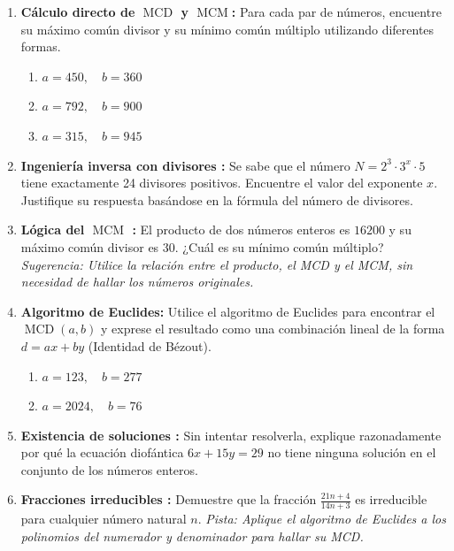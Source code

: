 \begin{enumerate}
    
    \item \textbf{Cálculo directo de $\operatorname{MCD}$ y $\operatorname{MCM}$:} 
    Para cada par de números, encuentre su máximo común divisor y su mínimo común múltiplo utilizando diferentes formas.
    \begin{enumerate}
        \item $a = 450, \quad b = 360$
        \item $a = 792, \quad b = 900$
        \item $a = 315, \quad b = 945$
    \end{enumerate}

    \item \textbf{Ingeniería inversa con divisores :}
    Se sabe que el número $N = 2^3 \cdot 3^x \cdot 5$ tiene exactamente 24 divisores positivos. Encuentre el valor del exponente $x$. Justifique su respuesta basándose en la fórmula del número de divisores.

    \item \textbf{Lógica del $\operatorname{MCM}$ :}
    El producto de dos números enteros es $16200$ y su máximo común divisor es $30$. ¿Cuál es su mínimo común múltiplo? 
    \textit{Sugerencia: Utilice la relación entre el producto, el MCD y el MCM, sin necesidad de hallar los números originales.}


    \item \textbf{Algoritmo de Euclides:}
    Utilice el algoritmo de Euclides para encontrar el $\operatorname{MCD}(a,b)$ y exprese el resultado como una combinación lineal de la forma $d = ax + by$ (Identidad de Bézout).
    \begin{enumerate}
        \item $a = 123, \quad b = 277$
        \item $a = 2024, \quad b = 76$
    \end{enumerate}

    \item \textbf{Existencia de soluciones :}
    Sin intentar resolverla, explique razonadamente por qué la ecuación diofántica $6x + 15y = 29$ no tiene ninguna solución en el conjunto de los números enteros.
    
    \item \textbf{Fracciones irreducibles :}
    Demuestre que la fracción $\frac{21n + 4}{14n + 3}$ es irreducible para cualquier número natural $n$.
    \textit{Pista: Aplique el algoritmo de Euclides a los polinomios del numerador y denominador para hallar su MCD.}


\end{enumerate}
